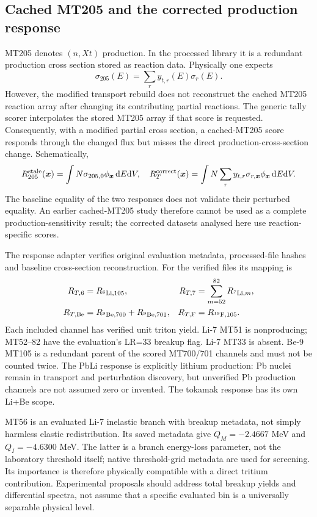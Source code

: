 \subsection{Cached MT205 and the corrected production response}
\label{sec:mt205}
MT205 denotes $(n,Xt)$ production. In the processed library it is a redundant production cross section stored as reaction data. Physically one expects
\begin{equation}
\sigma_{205}(E)=\sum_r y_{t,r}(E)\sigma_r(E).\label{eq:mt205}
\end{equation}
However, the modified transport rebuild does not reconstruct the cached MT205 reaction array after changing its contributing partial reactions. The generic tally scorer interpolates the stored MT205 array if that score is requested. Consequently, with a modified partial cross section, a cached-MT205 score responds through the changed flux but misses the direct production-cross-section change. Schematically,
\begin{equation}
R_{205}^{\rm stale}(\bm x)=\int N\sigma_{205,0}\phi_{\bm x}\,\mathrm{d} E\mathrm{d} V,
\quad
R_T^{\rm correct}(\bm x)=\int N\sum_r y_{t,r}\sigma_{r,\bm x}\phi_{\bm x}\,\mathrm{d} E\mathrm{d} V.
\end{equation}
The baseline equality of the two responses does not validate their perturbed equality. An earlier cached-MT205 study therefore cannot be used as a complete production-sensitivity result; the corrected datasets analysed here use reaction-specific scores.

The response adapter verifies original evaluation metadata, processed-file hashes and baseline cross-section reconstruction. For the verified files its mapping is
\begin{align}
R_{T,6}&=R_{{}^{6}\mathrm{Li},105},&
R_{T,7}&=\sum_{m=52}^{82}R_{{}^{7}\mathrm{Li},m},\\
R_{T,\mathrm{Be}}&=R_{{}^{9}\mathrm{Be},700}+R_{{}^{9}\mathrm{Be},701},&
R_{T,\mathrm{F}}&=R_{{}^{19}\mathrm{F},105}.\label{eq:mapping}
\end{align}
Each included channel has verified unit triton yield. Li-7 MT51 is nonproducing; MT52--82 have the evaluation's LR=33 breakup flag. Li-7 MT33 is absent. Be-9 MT105 is a redundant parent of the scored MT700/701 channels and must not be counted twice. The PbLi response is explicitly lithium production: Pb nuclei remain in transport and perturbation discovery, but unverified Pb production channels are not assumed zero or invented. The tokamak response has its own Li+Be scope.

MT56 is an evaluated Li-7 inelastic branch with breakup metadata, not simply harmless elastic redistribution. Its saved metadata give $Q_M=-2.4667$ MeV and $Q_I=-4.6300$ MeV. The latter is a branch energy-loss parameter, not the laboratory threshold itself; native threshold-grid metadata are used for screening. Its importance is therefore physically compatible with a direct tritium contribution. Experimental proposals should address total breakup yields and differential spectra, not assume that a specific evaluated bin is a universally separable physical level.

